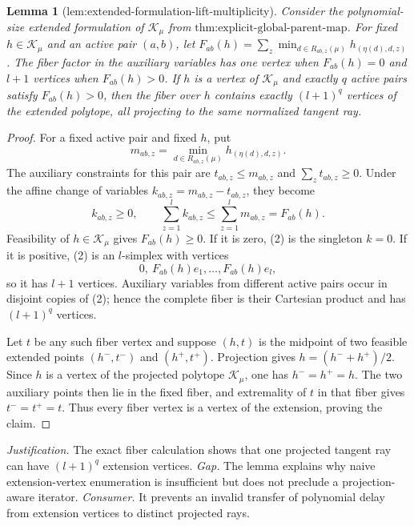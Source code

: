 \documentclass{article}
\newtheorem{lemma}{Lemma}
\begin{document}
\begin{lemma}[lem:extended-formulation-lift-multiplicity]\label{lem:extended-formulation-lift-multiplicity}
Consider the polynomial-size extended formulation of \(\mathcal K_\mu\) from \(\text{thm:explicit-global-parent-map}\). For fixed \(h\in\mathcal K_\mu\) and an active pair \((a,b)\), let \(F_{ab}(h)=\sum_z\min_{d\in R_{ab,z}(\mu)}h_{(\eta(d),d,z)}\). The fiber factor in the auxiliary variables has one vertex when \(F_{ab}(h)=0\) and \(l+1\) vertices when \(F_{ab}(h)>0\). If \(h\) is a vertex of \(\mathcal K_\mu\) and exactly \(q\) active pairs satisfy \(F_{ab}(h)>0\), then the fiber over \(h\) contains exactly \((l+1)^q\) vertices of the extended polytope, all projecting to the same normalized tangent ray.
\end{lemma}
\begin{proof}
For a fixed active pair and fixed \(h\), put
\[m_{ab,z}=\min_{d\in R_{ab,z}(\mu)}h_{(\eta(d),d,z)}.\tag{1}\]
The auxiliary constraints for this pair are \(t_{ab,z}\le m_{ab,z}\) and \(\sum_zt_{ab,z}\ge0\). Under the affine change of variables \(k_{ab,z}=m_{ab,z}-t_{ab,z}\), they become
\[k_{ab,z}\ge0,\qquad \sum_{z=1}^lk_{ab,z}\le\sum_{z=1}^lm_{ab,z}=F_{ab}(h).\tag{2}\]
Feasibility of \(h\in\mathcal K_\mu\) gives \(F_{ab}(h)\ge0\). If it is zero, (2) is the singleton \(k=0\). If it is positive, (2) is an \(l\)-simplex with vertices
\[0,\ F_{ab}(h)e_1,\ldots,F_{ab}(h)e_l,\tag{3}\]
so it has \(l+1\) vertices. Auxiliary variables from different active pairs occur in disjoint copies of (2); hence the complete fiber is their Cartesian product and has \((l+1)^q\) vertices.

Let \(t\) be any such fiber vertex and suppose \((h,t)\) is the midpoint of two feasible extended points \((h^-,t^-)\) and \((h^+,t^+)\). Projection gives \(h=(h^-+h^+)/2\). Since \(h\) is a vertex of the projected polytope \(\mathcal K_\mu\), one has \(h^-=h^+=h\). The two auxiliary points then lie in the fixed fiber, and extremality of \(t\) in that fiber gives \(t^-=t^+=t\). Thus every fiber vertex is a vertex of the extension, proving the claim.
\end{proof}
\par\smallskip\noindent \textit{Justification.} The exact fiber calculation shows that one projected tangent ray can have \((l+1)^q\) extension vertices. \textit{Gap.} The lemma explains why naive extension-vertex enumeration is insufficient but does not preclude a projection-aware iterator. \textit{Consumer.} It prevents an invalid transfer of polynomial delay from extension vertices to distinct projected rays.
\end{document}
